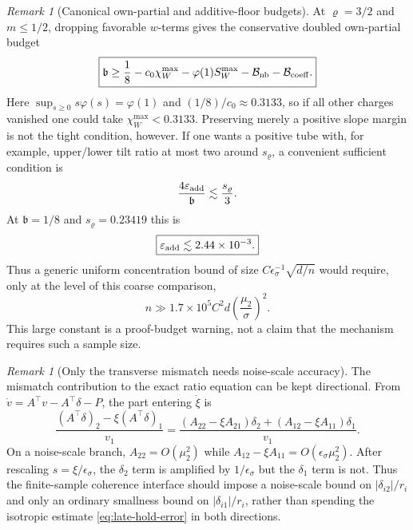 \documentclass{article} %
\theoremstyle{plain}
\theoremstyle{definition}
\theoremstyle{remark}
\newtheorem{remark}[theorem]{Remark}
\begin{document}
\begin{remark}[Canonical own-partial and additive-floor budgets]
\label{sbcoh:canonical-spread-budget}
At $\varrho=3/2$ and $m\le1/2$, dropping favorable $w$-terms gives the
conservative doubled own-partial budget
\begin{equation}\label{sbcoh:canonical-own-budget}
 \boxed{
 \mathfrak b
 \ge\frac18
 -c_0\chi_W^{\max}
 -\varphi(1)S_W^{\max}
 -\mathcal B_{\rm nb}
 -\mathcal B_{\rm coeff}.
 }
\end{equation}
Here
$\sup_{s\ge0}s\varphi(s)=\varphi(1)$ and
$(1/8)/c_0\approx0.3133$, so if all other charges vanished one could take
$\chi_W^{\max}<0.3133$.  Preserving merely a positive slope margin is not the
tight condition, however.  If one wants a positive tube with, for example,
upper/lower tilt ratio at most two around $s_\varrho$, a convenient sufficient
condition is
\[
 \frac{4\varepsilon_{\rm add}}{\mathfrak b}\lesssim\frac{s_\varrho}{3}.
\]
At $\mathfrak b=1/8$ and $s_\varrho=0.23419$ this is
\begin{equation}\label{sbcoh:additive-floor-canonical}
 \boxed{
 \varepsilon_{\rm add}\lesssim2.44\times10^{-3}.
 }
\end{equation}
Thus a generic uniform concentration bound of size
$C\epsilon_\sigma^{-1}\sqrt{d/n}$ would require, only at the level of this
coarse comparison,
\[
 n\gg 1.7\times10^5 C^2 d\left(\frac{\mu_2}{\sigma}\right)^2.
\]
This large constant is a proof-budget warning, not a claim that the mechanism
requires such a sample size.
\end{remark}

\begin{remark}[Only the transverse mismatch needs noise-scale accuracy]
\label{sbcoh:directional-mismatch}
The mismatch contribution to the exact ratio equation can be kept directional.
From
$\dot v=A^\top v-A^\top\delta-P$, the part entering $\dot\xi$ is
\begin{equation}\label{sbcoh:directional-mismatch-eq}
 \frac{(A^\top\delta)_2-\xi(A^\top\delta)_1}{v_1}
 =\frac{(A_{22}-\xi A_{21})\delta_2
       +(A_{12}-\xi A_{11})\delta_1}{v_1}.
\end{equation}
On a noise-scale branch, $A_{22}=O(\mu_2^2)$ while
$A_{12}-\xi A_{11}=O(\epsilon_\sigma\mu_2^2)$.  After rescaling
$s=\xi/\epsilon_\sigma$, the $\delta_2$ term is amplified by
$1/\epsilon_\sigma$ but the $\delta_1$ term is not.  Thus the finite-sample
coherence interface should impose a noise-scale bound on
$|\delta_{i2}|/r_i$ and only an ordinary smallness bound on
$|\delta_{i1}|/r_i$, rather than spending the isotropic estimate
\eqref{eq:late-hold-error} in both directions.
\end{remark}
\end{document}
